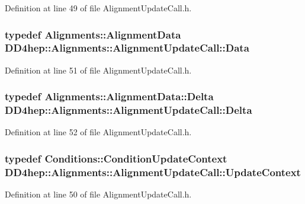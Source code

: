 Definition at line 49 of file AlignmentUpdateCall.h.\hypertarget{class_d_d4hep_1_1_alignments_1_1_alignment_update_call_af07241d13f0759c3a94c4589463cfb1b}{
\subsubsection[{Data}]{\setlength{\rightskip}{0pt plus 5cm}typedef {\bf Alignments::AlignmentData} {\bf DD4hep::Alignments::AlignmentUpdateCall::Data}}}
\label{class_d_d4hep_1_1_alignments_1_1_alignment_update_call_af07241d13f0759c3a94c4589463cfb1b}


Definition at line 51 of file AlignmentUpdateCall.h.\hypertarget{class_d_d4hep_1_1_alignments_1_1_alignment_update_call_a06a6522dece2daba45cdc69c079e144c}{
\subsubsection[{Delta}]{\setlength{\rightskip}{0pt plus 5cm}typedef {\bf Alignments::AlignmentData::Delta} {\bf DD4hep::Alignments::AlignmentUpdateCall::Delta}}}
\label{class_d_d4hep_1_1_alignments_1_1_alignment_update_call_a06a6522dece2daba45cdc69c079e144c}


Definition at line 52 of file AlignmentUpdateCall.h.\hypertarget{class_d_d4hep_1_1_alignments_1_1_alignment_update_call_a648c995a6ab187911c79a687c8df0fa9}{
\subsubsection[{UpdateContext}]{\setlength{\rightskip}{0pt plus 5cm}typedef {\bf Conditions::ConditionUpdateContext} {\bf DD4hep::Alignments::AlignmentUpdateCall::UpdateContext}}}
\label{class_d_d4hep_1_1_alignments_1_1_alignment_update_call_a648c995a6ab187911c79a687c8df0fa9}


Definition at line 50 of file AlignmentUpdateCall.h.

